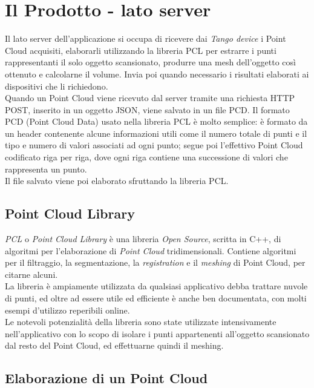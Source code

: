 \newpage

\section{Il Prodotto - lato server}
Il lato server dell'applicazione si occupa di ricevere dai \emph{Tango device} i Point Cloud acquisiti, elaborarli utilizzando la libreria PCL per estrarre i punti rappresentanti il solo oggetto scansionato, produrre una mesh dell'oggetto così ottenuto e calcolarne il volume. Invia poi quando necessario i risultati elaborati ai dispositivi che li richiedono.\\
Quando un Point Cloud viene ricevuto dal server tramite una richiesta HTTP POST, inserito in un oggetto JSON, viene salvato in un file PCD. Il formato PCD (Point Cloud Data) usato nella libreria PCL è molto semplice: è formato da un header contenente alcune informazioni utili come il numero totale di punti e il tipo e numero di valori associati ad ogni punto; segue poi l'effettivo Point Cloud codificato riga per riga, dove ogni riga contiene una successione di valori che rappresenta un punto.\\
Il file salvato viene poi elaborato sfruttando la libreria PCL.

\subsection{Point Cloud Library}
\emph{PCL} o \emph{Point Cloud Library} è una libreria \emph{Open Source}, scritta in C++, di algoritmi per l'elaborazione di \emph{Point Cloud} tridimensionali. Contiene algoritmi per il filtraggio, la segmentazione, la \emph{registration} e il \emph{meshing} di Point Cloud, per citarne alcuni. \\
La libreria è ampiamente utilizzata da qualsiasi applicativo debba trattare nuvole di punti, ed oltre ad essere utile ed efficiente è anche ben documentata, con molti esempi d'utilizzo reperibili online.\\
Le notevoli potenzialità della libreria sono state utilizzate intensivamente nell'applicativo con lo scopo di isolare i punti appartenenti all'oggetto scansionato dal resto del Point Cloud, ed effettuarne quindi il meshing.

\subsection{Elaborazione di un Point Cloud}

